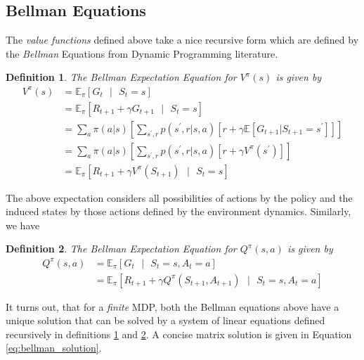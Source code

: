 \documentclass[12pt,a4paper]{article}
\newtheorem{definition}{Definition}
\begin{document}
\subsection{Bellman Equations}

The \textit{value functions} defined above take a nice recursive form which are defined by
the \textit{Bellman} Equations \cite{Bellman:1957} from Dynamic Programming literature.

\begin{definition} \label{def:bellman_state_value}
The Bellman Expectation Equation for $V^\pi(s)$ is given by
\begin{align}
V^\pi(s) &= \mathbb{E}_\pi \left[ G_t\text{ }|\text{ }S_t=s \right] \\ \nonumber
&= \mathbb{E}_\pi \left[ R_{t+1} + \gamma G_{t+1}\text{ }|\text{ }S_t=s \right] \\ \nonumber
&= \sum_{a} \pi(a|s) \left[ \sum_{s^\prime, r} p(s^\prime,r | s, a) \left[ r + \gamma \mathbb{E}\left[G_{t+1}|S_{t+1}=s^\prime \right] \right] \right] \\ \nonumber
&= \sum_{a} \pi(a|s) \left[ \sum_{s^\prime, r} p(s^\prime,r | s, a) \left[ r + \gamma V^\pi(s^\prime) \right] \right] \\ \nonumber
&= \mathbb{E}_\pi \left[ R_{t+1} + \gamma V^\pi(S_{t+1})\text{ }|\text{ }S_t=s \right]
\end{align}
\end{definition}

The above expectation considers all possibilities of actions by the policy and the induced 
states by those actions defined by the environment dynamics. Similarly, we have

\begin{definition} \label{def:bellman_action_value}
The Bellman Expectation Equation for $Q^\pi(s,a)$ is given by
\begin{align}
Q^\pi(s,a) &= \mathbb{E}_\pi \left[ G_t\text{ }|\text{ }S_t=s, A_t=a \right] \\ \nonumber
&= \mathbb{E}_\pi \left[ R_{t+1} + \gamma Q^\pi(S_{t+1},A_{t+1})\text{ }|\text{ }S_t=s, A_t=a \right]
\end{align}
\end{definition}

It turns out, that for a \textit{finite} MDP, both the Bellman equations above have a unique
solution that can be solved by a system of linear equations defined recursively in definitions
\ref{def:bellman_state_value} and \ref{def:bellman_action_value}. A concise matrix solution is
given in Equation \ref{eq:bellman_solution}.
\end{document}
